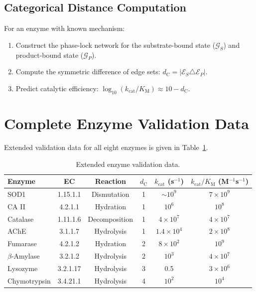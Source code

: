 \documentclass[aps,prx,superscriptaddress,twocolumn,10pt,a4paper,longbibliography,preprint]{revtex4-2}
\newcommand{\dC}{d_{\mathrm{C}}}
\newcommand{\kcat}{k_{\mathrm{cat}}}
\newcommand{\Km}{K_{\mathrm{M}}}
\newcommand{\calG}{\mathcal{G}}
\newcommand{\calE}{\mathcal{E}}
\theoremstyle{definition}
\theoremstyle{remark}
\begin{document}
\subsection{Categorical Distance Computation}

For an enzyme with known mechanism:
\begin{enumerate}
\item Construct the phase-lock network for the substrate-bound state ($\calG_S$) and product-bound state ($\calG_P$).
\item Compute the symmetric difference of edge sets: $\dC = |\calE_S \triangle \calE_P|$.
\item Predict catalytic efficiency: $\log_{10}(\kcat/\Km) \approx 10 - \dC$.
\end{enumerate}

\section{Complete Enzyme Validation Data}
\label{app:enzymes}

Extended validation data for all eight enzymes is given in Table~\ref{tab:enzymes_full}.

\begin{table}[h]
\centering
\caption{Extended enzyme validation data.}
\label{tab:enzymes_full}
\begin{tabular}{lccccc}
\toprule
Enzyme & EC & Reaction & $\dC$ & $\kcat$ (s$^{-1}$) & $\kcat/\Km$ (M$^{-1}$s$^{-1}$) \\
\midrule
SOD1 & 1.15.1.1 & Dismutation & 1 & $\sim 10^9$ & $7 \times 10^9$ \\
CA II & 4.2.1.1 & Hydration & 1 & $10^6$ & $10^8$ \\
Catalase & 1.11.1.6 & Decomposition & 1 & $4 \times 10^7$ & $4 \times 10^7$ \\
AChE & 3.1.1.7 & Hydrolysis & 1 & $1.4 \times 10^4$ & $2 \times 10^8$ \\
Fumarase & 4.2.1.2 & Hydration & 2 & $8 \times 10^2$ & $10^9$ \\
$\beta$-Amylase & 3.2.1.2 & Hydrolysis & 2 & $10^3$ & $4 \times 10^7$ \\
Lysozyme & 3.2.1.17 & Hydrolysis & 3 & 0.5 & $3 \times 10^6$ \\
Chymotrypsin & 3.4.21.1 & Hydrolysis & 4 & $10^2$ & $10^4$ \\
\bottomrule
\end{tabular}
\end{table}



\end{document}
